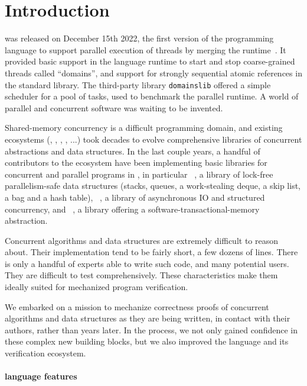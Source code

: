 \section{Introduction}
\label{sec:introduction}

 was released on December 15th 2022, the first version of the \OCaml programming language to support parallel execution of \OCaml threads by merging the \MulticoreOCaml runtime~\citep*{DBLP:journals/pacmpl/Sivaramakrishnan20}.
It provided basic support in the language runtime to start and stop coarse-grained threads called ``domains'', and support for strongly sequential atomic references in the standard library.
The third-party library \texttt{domainslib} offered a simple scheduler for a pool of tasks, used to benchmark the parallel runtime.
A world of parallel and concurrent software was waiting to be invented.

Shared-memory concurrency is a difficult programming domain, and existing ecosystems (\Cpp, \Java, \Haskell, \Rust, \Go...) took decades to evolve comprehensive libraries of concurrent abstractions and data structures.
In the last couple years, a handful of contributors to the \OCaml ecosystem have been implementing basic libraries for concurrent and parallel programs in \OCaml, in particular \Saturn~\citep*{saturn}, a library of lock-free parallelism-safe data structures (stacks, queues, a work-stealing deque, a skip list, a bag and a hash table), \Eio~\citep*{eio}, a library of asynchronous IO and structured concurrency, and \Kcas~\citep*{kcas}, a library offering a software-transactional-memory abstraction.

Concurrent algorithms and data structures are extremely difficult to reason about.
Their implementation tend to be fairly short, a few dozens of lines.
There is only a handful of experts able to write such code, and many potential users.
They are difficult to test comprehensively.
These characteristics make them ideally suited for mechanized program verification.

We embarked on a mission to mechanize correctness proofs of \OCaml concurrent algorithms and data structures as they are being written, in contact with their authors, rather than years later.
In the process, we not only gained confidence in these complex new building blocks, but we also improved the \OCaml language and its verification ecosystem.

\paragraph{\OCaml language features}


